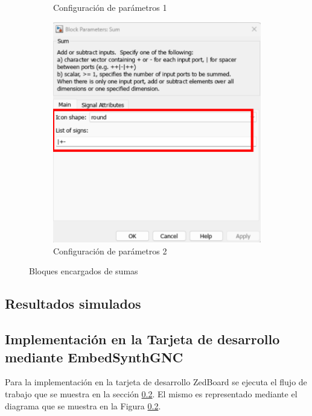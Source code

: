 \begin{figure}[htbp]
\begin{subfigure}[b]{0.45\textwidth}
        \caption{Configuración de parámetros 1}
        \label{fig:parametros_add_01}
    \end{subfigure}
    \hfill
    \begin{subfigure}[b]{0.45\textwidth}
        \centering
        \includegraphics[width=\textwidth]{fig/Capitulo5/Caso_de_estudio_PID/config_sum_02.pdf}
        \caption{Configuración de parámetros 2}
        \label{fig:parametros_add_02}
    \end{subfigure}

    \caption{Bloques encargados de sumas}
    \label{fig:arreglo_add}
\end{figure}

\subsection{Resultados simulados}\label{subsub:resultados_simulados_PID}

\subsection{Implementación en la Tarjeta de desarrollo mediante EmbedSynthGNC}

Para la implementación en la tarjeta de desarrollo ZedBoard se ejecuta el flujo de trabajo que se muestra en la sección \ref{}. El mismo es representado mediante el diagrama que se muestra en la Figura \ref{}.

